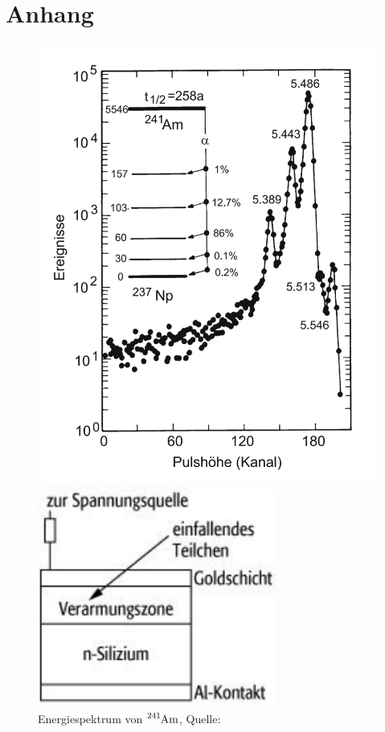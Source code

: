 \documentclass[12pt,a4paper]{scrartcl}
\numberwithin{equation}{section} %
\renewcommand{\[}{} %
\renewcommand{\]}{\noindent} %
\begin{document}
\clearpage
\hypertarget{Anhang}{
	\section{Anhang}}
	
\begin{figure}[h!]
	\centering
	
	\begin{minipage}{0.45\textwidth}
		\centering
		\includegraphics[width=\textwidth]{../media/B3.3/Am241_Spektrum.jpg}
		\caption{Energiespektrum von $\ce{^241Am}$, Quelle: \cite{Bethge}}
		\label{abb:Spektrum}
	\end{minipage}
	\begin{minipage}{0.45\textwidth}
		\centering
		\includegraphics[width=0.7\textwidth]{../media/B3.3/Oberflaechensperrschichtzaehler.pdf}

\end{minipage}
\end{figure}
\end{document}
